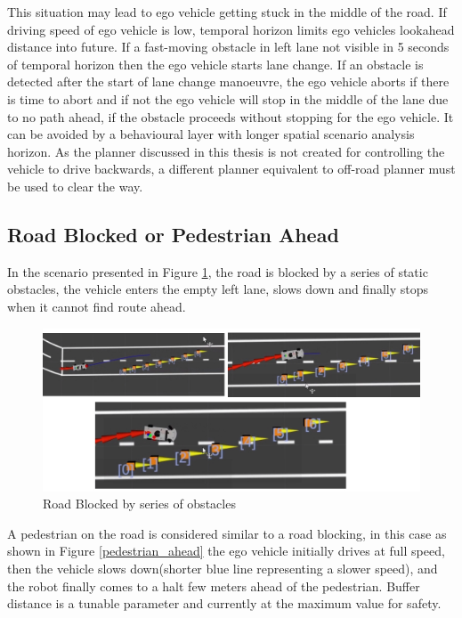 This situation may lead to ego vehicle getting stuck in the middle of the road. If driving speed of ego vehicle is low, temporal horizon limits ego vehicles lookahead distance into future. If a fast-moving obstacle in left lane not visible in 5 seconds of temporal horizon then the ego vehicle starts lane change. If an obstacle is detected after the start of lane change manoeuvre, the ego vehicle aborts if there is time to abort and if not the ego vehicle will stop in the middle of the lane due to no path ahead, if the obstacle proceeds without stopping for the ego vehicle. It can be avoided by a behavioural layer with longer spatial scenario analysis horizon. As the planner discussed in this thesis is not created for controlling the vehicle to drive backwards, a different planner equivalent to off-road planner must be used to clear the way.  


\subsection{Road Blocked or Pedestrian Ahead}

In the scenario presented in Figure \ref{road_blocked}, the road is blocked by a series of static obstacles, the vehicle enters the empty left lane, slows down and finally stops when it cannot find route ahead. 

\begin{figure}[h]
    \centering
    \includegraphics[width=1.0\textwidth]{Images/evaluation/road_blocked1.jpg}
    \caption{Road Blocked by series of obstacles}
    \label{road_blocked}
\end{figure}

A pedestrian on the road is considered similar to a road blocking, in this case as shown in Figure \ref{pedestrian_ahead} the ego vehicle initially drives at full speed, then the vehicle slows down(shorter blue line representing a slower speed), and the robot finally comes to a halt few meters ahead of the pedestrian. Buffer distance is a tunable parameter and currently at the maximum value for safety. 

